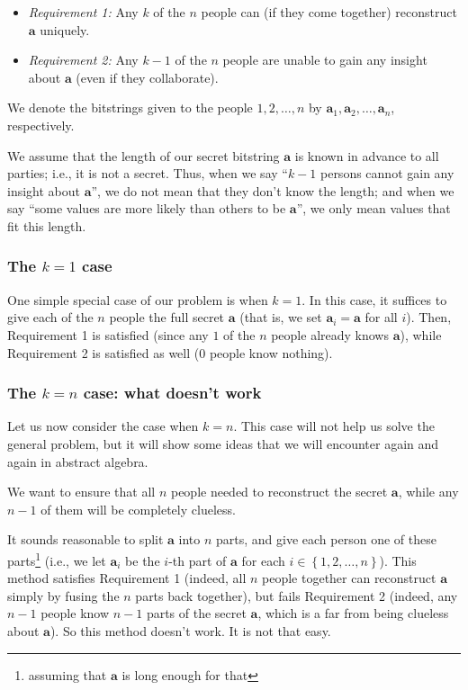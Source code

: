 \documentclass[numbers=enddot,12pt,final,onecolumn,notitlepage]{scrartcl}%
\numberwithin{exer}{subsection}
\theoremstyle{definition}
\begin{document}
\begin{itemize}
\item \textit{Requirement 1:} Any $k$ of the $n$ people can (if they come
together) reconstruct $\mathbf{a}$ uniquely.

\item \textit{Requirement 2:} Any $k-1$ of the $n$ people are unable to gain
any insight about $\mathbf{a}$ (even if they collaborate).
\end{itemize}

We denote the bitstrings given to the people $1,2,\ldots,n$ by $\mathbf{a}%
_{1},\mathbf{a}_{2},\ldots,\mathbf{a}_{n}$, respectively.

We assume that the length of our secret bitstring $\mathbf{a}$ is known in
advance to all parties; i.e., it is not a secret. Thus, when we say
\textquotedblleft$k-1$ persons cannot gain any insight about $\mathbf{a}%
$\textquotedblright, we do not mean that they don't know the length; and when
we say \textquotedblleft some values are more likely than others to be
$\mathbf{a}$\textquotedblright, we only mean values that fit this length.

\subsubsection{The $k=1$ case}

One simple special case of our problem is when $k=1$. In this case, it
suffices to give each of the $n$ people the full secret $\mathbf{a}$ (that is,
we set $\mathbf{a}_{i}=\mathbf{a}$ for all $i$). Then, Requirement 1 is
satisfied (since any $1$ of the $n$ people already knows $\mathbf{a}$), while
Requirement 2 is satisfied as well ($0$ people know nothing).

\subsubsection{The $k=n$ case: what doesn't work}

Let us now consider the case when $k=n$. This case will not help us solve the
general problem, but it will show some ideas that we will encounter again and
again in abstract algebra.

We want to ensure that all $n$ people needed to reconstruct the secret
$\mathbf{a}$, while any $n-1$ of them will be completely clueless.

It sounds reasonable to split $\mathbf{a}$ into $n$ parts, and give each
person one of these parts\footnote{assuming that $\mathbf{a}$ is long enough
for that} (i.e., we let $\mathbf{a}_{i}$ be the $i$-th part of $\mathbf{a}$
for each $i\in\left\{  1,2,\ldots,n\right\}  $). This method satisfies
Requirement 1 (indeed, all $n$ people together can reconstruct $\mathbf{a}$
simply by fusing the $n$ parts back together), but fails Requirement 2
(indeed, any $n-1$ people know $n-1$ parts of the secret $\mathbf{a}$, which
is a far from being clueless about $\mathbf{a}$). So this method doesn't work.
It is not that easy.
\end{document}
